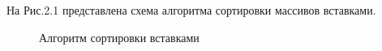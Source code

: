 \documentclass[a4paper,12pt]{report}
\begin{document}
\hspace{0.6cm}На Рис.2.1 представлена схема алгоритма сортировки массивов вставками.
\begin{figure}[ht!]
\caption{Алгоритм сортировки вставками}
\newpage
\end{figure}
\newpage
\end{document}
